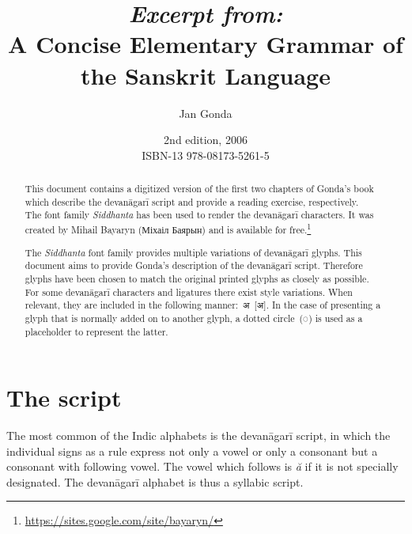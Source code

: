 \documentclass{article}
\newcommand{\siddhanta}[1]{\mbox{\Siddhanta#1}}
\newcommand{\siddhantaII}[1]{\mbox{\SiddhantaII#1}}
\newcommand{\siddhantafontname}[1]{\textit{Siddhanta#1}}
\newcommand{\lingual}[1]{\textit{#1}}
\newcommand{\alt}[2]{#1~[#2]}
\newcommand{\siddhantaIIsiddhanta}[2]{\alt{\siddhantaII{#1}}{\siddhanta{#2}}}
\begin{document}
\title{\textit{\normalsize Excerpt from:}\\A Concise Elementary Grammar of the Sanskrit Language}
\author{Jan Gonda}
\date{2nd edition, 2006\\\footnotesize ISBN-13 978-08173-5261-5}
\maketitle
\thispagestyle{empty}

\renewcommand{\abstractname}{Notes}
\begin{abstract}
	This document contains a digitized version of the first two chapters of Gonda's book which describe the devanāgarī script and provide a reading exercise, respectively.\\
	
	The font family \siddhantafontname{} has been used to render the devanāgarī characters. It was created by Mihail Bayaryn (Міхаіл Баярын) and is available for free.\footnote{\url{https://sites.google.com/site/bayaryn/}}
	
	The \siddhantafontname{} font family provides multiple variations of devanāgarī glyphs. This document aims to provide Gonda's description of the devanāgarī script. Therefore glyphs have been chosen to match the original printed glyphs as closely as possible.\\
	
	For some devanāgarī characters and ligatures there exist style variations. When relevant, they are included in the following manner:~\siddhantaIIsiddhanta{अ}{अ}. In the case of presenting a glyph that is normally added on to another glyph, a dotted circle~(\siddhanta{◌}) is used as a placeholder to represent the latter.
\end{abstract}

\clearpage

\section*{The script}

The most common of the Indic alphabets is the devanāgarī script, in which the individual signs as a rule express not only a vowel or only a consonant but a consonant with following vowel. The vowel which follows is \lingual{ă} if it is not specially designated. The devanāgarī alphabet is thus a syllabic script.\\
\end{document}
